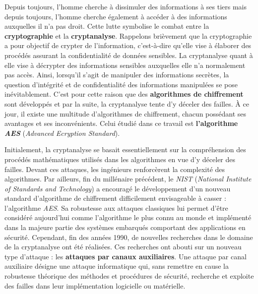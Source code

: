 \documentclass[oneside]{book}
\begin{document}
Depuis toujours, l’homme cherche à dissimuler des informations à ses tiers mais depuis toujours, l’homme cherche également à accéder à des informations auxquelles il n’a pas droit. Cette lutte symbolise le combat entre la \textbf{cryptographie} et la \textbf{cryptanalyse}. Rappelons brièvement que la cryptographie a pour objectif de crypter de l’information, c’est-à-dire qu’elle vise à élaborer des procédés assurant la confidentialité de données sensibles. La cryptanalyse quant à elle vise à décrypter des informations sensibles auxquelles elle n'a normalement pas accès. Ainsi, lorsqu'il s'agit de manipuler des informations secrètes, la question d'intégrité et de confidentialité des informations manipulées se pose inévitablement. C'est pour cette raison que des \textbf{algorithmes de chiffrement} sont développés et par la suite, la cryptanalyse tente d'y déceler des failles. À ce jour, il existe une multitude d'algorithmes de chiffrement, chacun possédant ses avantages et ses inconvénients. Celui étudié dans ce travail est \textbf{l'algorithme \textit{AES}} (\textit{Advanced Ecryption Standard}).

Initialement, la cryptanalyse se basait essentiellement sur la compréhension des procédés mathématiques utilisés dans les algorithmes en vue d'y déceler des failles. Devant ces attaques, les ingénieurs renforcèrent la complexité des algorithmes. Par ailleurs, fin du millénaire précédent, le \textit{NIST} (\textit{National Institute of Standards and Technology}) a encouragé le développement d’un nouveau standard d’algorithme de chiffrement difficilement envisageable à casser : l’algorithme \textit{AES}. Sa robustesse aux attaques classiques lui permet d'être considéré aujourd’hui comme l'algorithme le plus connu au monde et implémenté dans la majeure partie des systèmes embarqués comportant des applications en sécurité. Cependant, fin des années 1990, de nouvelles recherches dans le domaine de la cryptanalyse ont été réalisées. Ces recherches ont abouti sur un nouveau type d'attaque : les \textbf{attaques par canaux auxiliaires}. Une attaque par canal auxiliaire désigne une attaque informatique qui, sans remettre en cause la robustesse théorique des méthodes et procédures de sécurité, recherche et exploite des failles dans leur implémentation logicielle ou matérielle. 
\end{document}
